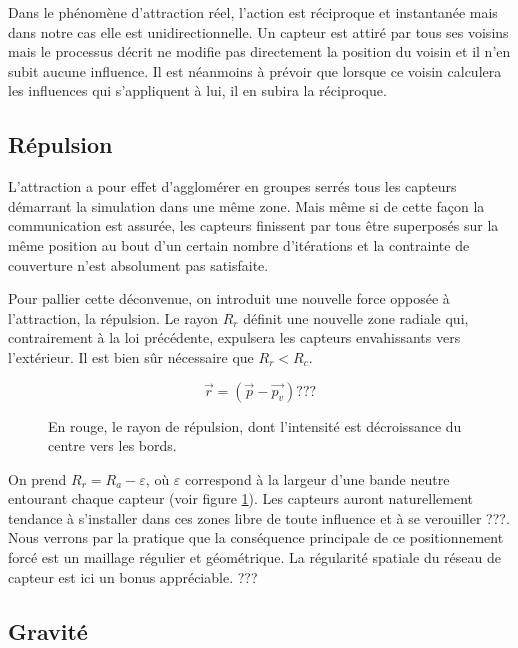 \documentclass[10pt]{article}
\begin{document}
\begin{multicols}{2}
Dans le phénomène d'attraction réel, l'action est réciproque et
instantanée mais dans notre cas elle est unidirectionnelle. Un capteur
est attiré par tous ses voisins mais le processus décrit ne modifie
pas directement la position du voisin et il n'en subit aucune
influence. Il est néanmoins à prévoir que lorsque ce voisin calculera
les influences qui s'appliquent à lui, il en subira la réciproque.

\subsection{Répulsion}

L'attraction a pour effet d'agglomérer en groupes serrés tous les
capteurs démarrant la simulation dans une même zone. Mais même si de
cette façon la communication est assurée, les capteurs finissent par
tous être superposés sur la même position au bout d'un certain nombre
d'itérations et la contrainte de couverture n'est absolument pas
satisfaite.

Pour pallier cette déconvenue, on introduit une nouvelle force opposée
à l'attraction, la répulsion. Le rayon $R_r$ définit une nouvelle zone
radiale qui, contrairement à la loi précédente, expulsera les capteurs
envahissants vers l'extérieur. Il est bien sûr nécessaire que $R_r <
R_c$.

$$
\vec{r} = (\vec{p} - \vec{p_v}) ???
$$

\begin{figure}[H]

  \centering

  

  \caption{En rouge, le rayon de répulsion, dont l'intensité est
    décroissance du centre vers les bords.}
  \label{repulsion}

\end{figure}

On prend $R_r = R_a - \varepsilon$, o\`u $\varepsilon$ correspond à la
largeur d'une bande neutre entourant chaque capteur (voir figure
\ref{repulsion}). Les capteurs auront naturellement tendance à
s'installer dans ces zones libre de toute influence et à se verouiller
???. Nous verrons par la pratique que la conséquence principale de ce
positionnement forcé est un maillage régulier et géométrique. La
régularité spatiale du réseau de capteur est ici un bonus
appréciable. ???

\subsection{Gravité}


\end{multicols}
\end{document}
